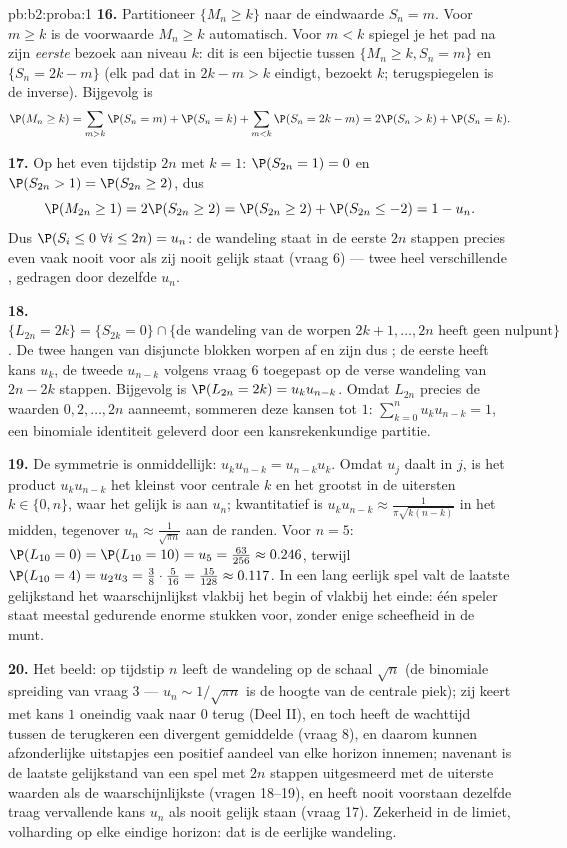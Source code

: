 \begin{solution}{pb:b2:proba:1}
\textbf{16.} Partitioneer $\{M_n \geq k\}$ naar de eindwaarde $S_n
= m$. Voor $m \geq k$ is de voorwaarde $M_n \geq k$ automatisch.
Voor $m < k$ spiegel je het pad na zijn \emph{eerste} bezoek aan
niveau $k$: dit is een bijectie tussen $\{M_n \geq k, S_n = m\}$ en
$\{S_n = 2k - m\}$ (elk pad dat in $2k - m > k$ eindigt, bezoekt
$k$; terugspiegelen is de inverse). Bijgevolg is
\[
\P(M_n \geq k)
= \sum_{m > k}\P(S_n = m) + \P(S_n = k)
+ \sum_{m < k}\P(S_n = 2k - m)
= 2\P(S_n > k) + \P(S_n = k).
\]

\textbf{17.} Op het even tijdstip $2n$ met $k = 1$: $\P(S_{2n} =
1) = 0$ en $\P(S_{2n} > 1) = \P(S_{2n} \geq 2)$, dus
\[
\P(M_{2n} \geq 1) = 2\P(S_{2n} \geq 2)
= \P(S_{2n} \geq 2) + \P(S_{2n} \leq -2)
= 1 - u_n .
\]
Dus $\P(S_i \leq 0\ \forall i \leq 2n) = u_n$: de wandeling staat
in de eerste $2n$ stappen precies even vaak nooit voor als zij
nooit gelijk staat (vraag 6) --- twee heel verschillende
, gedragen door dezelfde $u_n$.

\textbf{18.} $\{L_{2n} = 2k\} = \{S_{2k} = 0\} \cap \{\text{de
wandeling van de worpen } 2k+1, \dots, 2n \text{ heeft geen
nulpunt}\}$. De twee  hangen van disjuncte blokken
worpen af en zijn dus ; de eerste heeft kans $u_k$, de
tweede $u_{n-k}$ volgens vraag 6 toegepast op de verse wandeling
van $2n-2k$ stappen. Bijgevolg is $\P(L_{2n} = 2k) = u_ku_{n-k}$.
Omdat $L_{2n}$ precies de waarden $0, 2, \dots, 2n$ aanneemt,
sommeren deze kansen tot $1$: $\sum_{k=0}^nu_ku_{n-k} = 1$, een
binomiale identiteit geleverd door een kansrekenkundige partitie.

\textbf{19.} De symmetrie is onmiddellijk: $u_ku_{n-k} =
u_{n-k}u_k$. Omdat $u_j$ daalt in $j$, is het product
$u_ku_{n-k}$ het kleinst voor centrale $k$ en het grootst in de
uitersten $k \in \{0, n\}$, waar het gelijk is aan $u_n$;
kwantitatief is $u_ku_{n-k} \approx \frac1{\pi\sqrt{k(n-k)}}$ in
het midden, tegenover $u_n \approx \frac1{\sqrt{\pi n}}$ aan de
randen. Voor $n = 5$: $\P(L_{10} = 0) = \P(L_{10} = 10) = u_5 =
\frac{63}{256} \approx 0.246$, terwijl $\P(L_{10} = 4) = u_2u_3 =
\frac38\cdot\frac5{16} = \frac{15}{128} \approx 0.117$. In een lang
eerlijk spel valt de laatste gelijkstand het waarschijnlijkst
vlakbij het begin of vlakbij het einde: één speler staat meestal
gedurende enorme stukken voor, zonder enige scheefheid in de munt.

\textbf{20.} Het beeld: op tijdstip $n$ leeft de wandeling op de
schaal $\sqrt n$ (de binomiale spreiding van vraag 3 --- $u_n \sim
1/\sqrt{\pi n}$ is de hoogte van de centrale piek); zij keert met
kans $1$ oneindig vaak naar $0$ terug (Deel II), en toch heeft de
wachttijd tussen de terugkeren een divergent gemiddelde (vraag 8),
en daarom kunnen afzonderlijke uitstapjes een positief aandeel van
elke horizon innemen; navenant is de laatste gelijkstand van een
spel met $2n$ stappen uitgesmeerd met de uiterste waarden als de
waarschijnlijkste (vragen 18--19), en heeft nooit voorstaan
dezelfde traag vervallende kans $u_n$ als nooit gelijk staan (vraag
17). Zekerheid in de limiet, volharding op elke eindige horizon:
dat is de eerlijke wandeling.


\end{solution}
